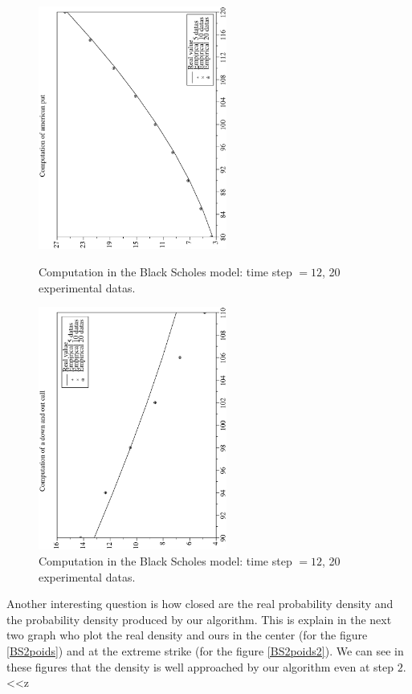 \documentclass[a4paper]{article}
\begin{document}
\begin{figure}[tbp]
\begin{center}
\includegraphics[height=8cm,angle=270]{ArticlePS/amer.eps}
\caption{Computation in the Black Scholes model: time step $=12$,
 20 experimental datas.\label{am}}
\includegraphics[height=8cm,angle=270]{ArticlePS/barr.eps}
\caption{Computation in the Black Scholes model: time step $=12$,
20 experimental datas.\label{barr}}
\end{center}
\end{figure}

Another interesting question  is how  closed are the real
probability density and the probability density produced by our
algorithm. This is explain in the next two graph who plot the real
density and ours in the center (for the figure \ref{BS2poids})
and at the extreme strike (for the figure \ref{BS2poids2}). We
can see in these figures that the density is well approached by
our algorithm even at step $2$.<<z
\end{document}
